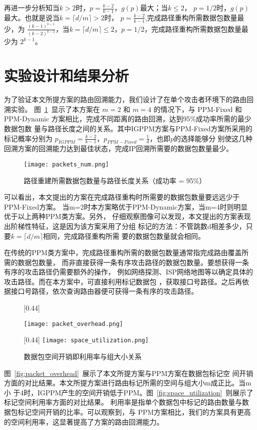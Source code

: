 再进一步分析知当$k>2$时，$p = \frac{k-2}{k-1}$，$g(p)$最大；当$k \leq 2$，
$p = 1/2$时，$g(p)$最大。也就是说当$k = \lceil d/m \rceil >2$时，
$p = \frac{k-2}{k-1}$,完成路径重构所需数据包数量最少，为
$\frac{(k-1)^{k-1}}{(k-2)^{k-2}}$，当$k = \lceil d/m 
\rceil \leq 2$，$p = 1/2$，完成路径重构所需数据包数量最少为
$2^{k-1}$。

\section{实验设计和结果分析}
\label{sec:bib}

为了验证本文所提方案的路由回溯能力，我们设计了在单个攻击者环境下的路由回溯实验。
图~\ref*{fig:packets_num}~显示了本方案在 $m=2$ 和 $m=4$ 的情况下，与 PPM-Fixed 
和 PPM-Dynamic 方案相比，完成不同距离的路由回溯，达到95\%成功率所需的最少数据包数
量与路径长度之间的关系。其中IGPPM方案与PPM-Fixed方案所采用的标记概率分别为
$p_{IGPPM}=\frac{k-2}{k-1}$，$p_{PPM-Fixed} = \frac{1}{d}$，也即$p$的选择能够分
别使这几种回溯方案的回溯能力达到最佳状态，完成IP回溯所需要的数据包数量最少。

\begin{figure}[htbp]
  \centering
  \texttt{[image: packets\_num.png]}
  \caption{路径重建所需数据包数量与路径长度关系（成功率 = 95\%）}
  \label{fig:packets_num}
\end{figure}   
可以看出，本文提出的方案在完成路径重构时所需要的数据包数量要远远少于PPM-Fixed方案。
当m=2时本方案略优于PPM-Dynamic方案，当m=4时则明显优于以上两种PPM类方案。另外，
仔细观察图像可以发现，本文提出的方案表现出阶梯性特征，这是因为该方案采用了分组
标记的方法：不管跳数d相差多少，只要$k = \lceil d/m \rceil$相同，完成路径重构所需
要的数据包数量就会相同。


在传统的PPM类方案中，完成路径重构所需的数据包数量通常指完成路由覆盖所需的数据包数量，
而非直接获得一条有序攻击路径的数据包数量。要想获得一条有序的攻击路径仍需要额外的操作，
例如网络探测、ISP网络地图等以确定具体的攻击路径。而在本方案中，可直接利用标记数据包
，获取接口号路径。之后再依据接口号路径，依次查询路由器便可获得一条有序的攻击路径。

\begin{figure}[htbp]
  \centering
  [0.44\textwidth]{
  \texttt{[image: packet\_overhead.png]}

  }
  \hspace{36pt}
  [0.44\textwidth]{
  \texttt{[image: space\_utilization.png]}
  }
  \caption{数据包空间开销即利用率与组大小关系}
\end{figure}
图~\ref*{fig:packet_overhead}~展示了本文所提方案与PPM方案在数据包标记空
间开销方面的对比结果。本文所提方案进行路由标记所需的空间与组大小m成正比。当m小
于4时，IGPPM产生的空间开销低于PPM。图~\ref*{fig:space_utilization}~则展示了标记空间利用率方面的对比结果。
利用率是指单个数据包中标记的路由数量与数据包标记空间开销的比率。可以观察到，与
PPM方案相比，我们的方案具有更高的空间利用率，这显著提高了方案的路由回溯能力。
